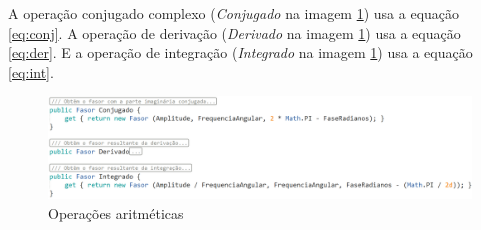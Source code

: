 \documentclass[conference,harvard, brazil]{sbatex}
\begin{document}
	A operação conjugado complexo ({\em Conjugado} na imagem \ref{fig:fasor_op_2}) usa a equação \ref{eq:conj}. A operação de derivação ({\em Derivado} na imagem \ref{fig:fasor_op_2}) usa a equação \ref{eq:der}. E a operação de integração ({\em Integrado} na imagem \ref{fig:fasor_op_2}) usa a equação \ref{eq:int}.
	\begin{figure}[h]
		\includegraphics[width=\columnwidth]{fasor_5}
		\caption{Operações aritméticas}
		\label{fig:fasor_op_2}
	\end{figure}
	
\end{document}
